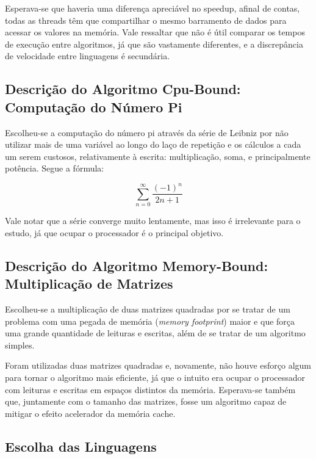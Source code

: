 \documentclass[12pt,a4paper]{article}
\begin{document}
Esperava-se que haveria uma diferença apreciável no speedup, afinal de contas, todas as threads têm que compartilhar o mesmo barramento de dados para acessar os valores na memória. Vale ressaltar que não é útil comparar os tempos de execução entre algoritmos, já que são vastamente diferentes, e a discrepância de velocidade entre linguagens é secundária.

\subsection{Descrição do Algoritmo Cpu-Bound: Computação do Número Pi}
\label{ssec:descricao algoritmo pi}

Escolheu-se a computação do número pi através da série de Leibniz por não utilizar mais de uma variável ao longo do laço de repetição e os cálculos a cada um serem custosos, relativamente à escrita: multiplicação, soma, e principalmente potência. Segue a fórmula:

\begin{equation}
    \sum_{n=0}^{\infty} \frac{\left ( -1 \right )^{n} }{ 2n+1 }
\end{equation}

Vale notar que a série converge muito lentamente, mas isso é irrelevante para o estudo, já que ocupar o processador é o principal objetivo.

\subsection{Descrição do Algoritmo Memory-Bound: Multiplicação de Matrizes}
\label{ssec:descricao algoritmo matriz}

Escolheu-se a multiplicação de duas matrizes quadradas por se tratar de um problema com uma pegada de memória (\emph{memory footprint}) maior e que força uma grande quantidade de leituras e escritas, além de se tratar de um algoritmo simples.

Foram utilizadas duas matrizes quadradas e, novamente, não houve esforço algum para tornar o algoritmo mais eficiente, já que o intuito era ocupar o processador com leituras e escritas em espaços distintos da memória. Esperava-se também que, juntamente com o tamanho das matrizes, fosse um algoritmo capaz de mitigar o efeito acelerador da memória cache.

\subsection{Escolha das Linguagens}
\label{ssec:escolha linguagens}
\end{document}
